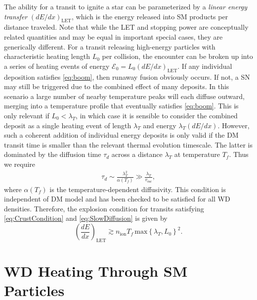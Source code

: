 \documentclass[twocolumn,showpacs,preprintnumbers,amsmath,amssymb,prd]{revtex4}
\newcommand{\Ez}{\mathcal{E}_0}
\begin{document}
The ability for a transit to ignite a star can be parameterized by a \emph{linear energy transfer} $(dE/dx)_\text{LET}$, which is the energy released into SM products per distance traveled.
Note that while the LET and stopping power are conceptually related quantities and may be equal in important special cases, they are generically different.
For a transit releasing high-energy particles with characteristic heating length $L_0$ per collision, the encounter can be broken up into a series of heating events of energy $\Ez = L_0 (d E/d x)_\text{LET}$.
If any individual deposition satisfies \eqref{eq:boom}, then runaway fusion obviously occurs.
If not, a SN may still be triggered due to the combined effect of many deposits.
In this scenario a large number of nearby temperature peaks will each diffuse outward, merging into a temperature profile that eventually satisfies \eqref{eq:boom}.
This is only relevant if $L_0 < \lambda_T$, in which case it is sensible to consider the combined deposit as a single heating event of length $\lambda_T$ and energy $\lambda_T (d E/d x)$.
However, such a coherent addition of individual energy deposits is only valid if the DM transit time is smaller than the relevant thermal evolution timescale.
The latter is dominated by the diffusion time $\tau_d$ across a distance $\lambda_T$ at temperature $T_f$.
Thus we require
\begin{align}
\tau_d \sim \frac{\lambda_T^2}{\alpha(T_f)} \gg \frac{\lambda_T}{v_\text{esc}},
\label{eq:SlowDiffusion}
\end{align}
where $\alpha(T_f)$ is the temperature-dependent diffusivity.
This condition is independent of DM model and has been checked to be satisfied for all WD densities.
Therefore, the explosion condition for transits satisfying \eqref{eq:CrustCondition} and \eqref{eq:SlowDiffusion} is given by
\begin{equation}
\label{eq:transitexplosion}
  \left( \frac{d E}{d x} \right)_\text{LET} \gtrsim n_\text{ion} T_f\, \text{max}\left\{\lambda_T, L_0 \right\}^2.
\end{equation}


\section{WD Heating Through SM Particles}
\label{sec:HeatingLength}
\end{document}
